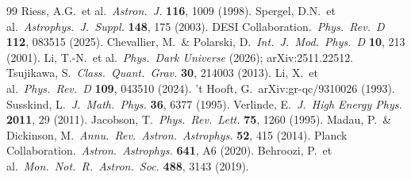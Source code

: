 \documentclass[12pt,a4paper]{article}
\begin{document}
\begin{thebibliography}{99}
 Riess, A.G.\ et al.\ {\it Astron.\ J.} {\bf 116}, 1009 (1998).
 Spergel, D.N.\ et al.\ {\it Astrophys.\ J.\ Suppl.} {\bf 148}, 175 (2003).
 DESI Collaboration.\ {\it Phys.\ Rev.\ D} {\bf 112}, 083515 (2025).
 Chevallier, M.\ \& Polarski, D.\ {\it Int.\ J.\ Mod.\ Phys.\ D} {\bf 10}, 213 (2001).
 Li, T.-N.\ et al.\ {\it Phys.\ Dark Universe} (2026); arXiv:2511.22512.
 Tsujikawa, S.\ {\it Class.\ Quant.\ Grav.} {\bf 30}, 214003 (2013).
 Li, X.\ et al.\ {\it Phys.\ Rev.\ D} {\bf 109}, 043510 (2024).
 't Hooft, G.\ arXiv:gr-qc/9310026 (1993).
 Susskind, L.\ {\it J.\ Math.\ Phys.} {\bf 36}, 6377 (1995).
 Verlinde, E.\ {\it J.\ High Energy Phys.} {\bf 2011}, 29 (2011).
 Jacobson, T.\ {\it Phys.\ Rev.\ Lett.} {\bf 75}, 1260 (1995).
 Madau, P.\ \& Dickinson, M.\ {\it Annu.\ Rev.\ Astron.\ Astrophys.} {\bf 52}, 415 (2014).
 Planck Collaboration.\ {\it Astron.\ Astrophys.} {\bf 641}, A6 (2020).
 Behroozi, P.\ et al.\ {\it Mon.\ Not.\ R.\ Astron.\ Soc.} {\bf 488}, 3143 (2019).
\end{thebibliography}
\end{document}
